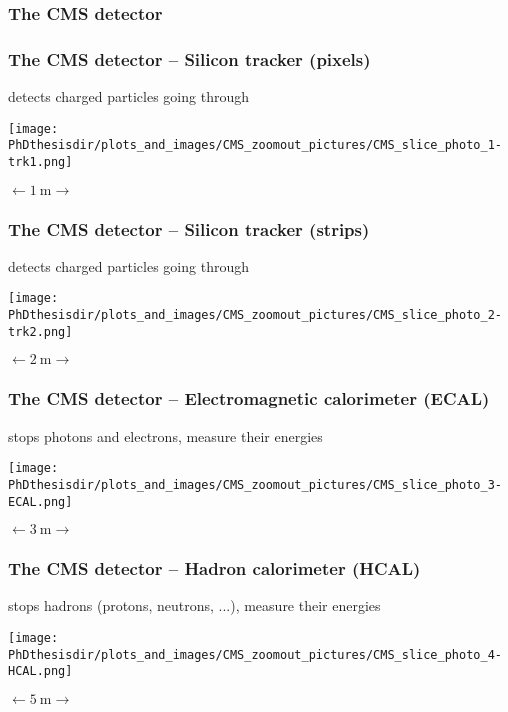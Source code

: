\begin{frame}
\frametitle{The CMS detector}
\end{frame}
\begin{frame}\addtocounter{framenumber}{-1}
\frametitle{The CMS detector -- Silicon tracker (pixels)}
\begin{center}
detects charged particles going through

\vfill

\texttt{[image: \\PhDthesisdir/plots\_and\_images/CMS\_zoomout\_pictures/CMS\_slice\_photo\_1-trk1.png]}

\vfill

$\longleftarrow \SI{1}{\meter} \longrightarrow$
\end{center}
\end{frame}
\begin{frame}\addtocounter{framenumber}{-1}
\frametitle{The CMS detector -- Silicon tracker (strips)}
\begin{center}
detects charged particles going through

\vfill

\texttt{[image: \\PhDthesisdir/plots\_and\_images/CMS\_zoomout\_pictures/CMS\_slice\_photo\_2-trk2.png]}

\vfill

$\longleftarrow \SI{2}{\meter} \longrightarrow$
\end{center}
\end{frame}
\begin{frame}\addtocounter{framenumber}{-1}
\frametitle{The CMS detector -- Electromagnetic calorimeter (ECAL)}
\begin{center}
stops photons and electrons, measure their energies

\vfill

\texttt{[image: \\PhDthesisdir/plots\_and\_images/CMS\_zoomout\_pictures/CMS\_slice\_photo\_3-ECAL.png]}

\vfill

$\longleftarrow \SI{3}{\meter} \longrightarrow$
\end{center}
\end{frame}
\begin{frame}\addtocounter{framenumber}{-1}
\frametitle{The CMS detector -- Hadron calorimeter (HCAL)}
\begin{center}
stops hadrons (protons, neutrons, ...), measure their energies

\vfill

\texttt{[image: \\PhDthesisdir/plots\_and\_images/CMS\_zoomout\_pictures/CMS\_slice\_photo\_4-HCAL.png]}

\vfill

$\longleftarrow \SI{5}{\meter} \longrightarrow$
\end{center}
\end{frame}
